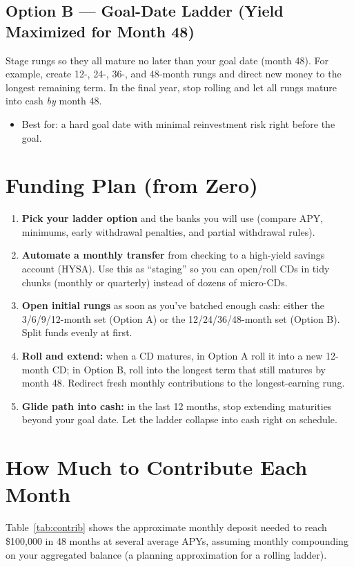 \documentclass[11pt]{article}
\begin{document}
\subsection*{Option B --- Goal-Date Ladder (Yield Maximized for Month 48)}
Stage rungs so they all mature no later than your goal date (month 48). For example, create 12-, 24-, 36-, and 48-month rungs and direct new money to the longest remaining term. In the final year, stop rolling and let all rungs mature into cash \emph{by} month 48.
\begin{itemize}
  \item Best for: a hard goal date with minimal reinvestment risk right before the goal.
\end{itemize}

\section*{Funding Plan (from Zero)}
\begin{enumerate}
  \item \textbf{Pick your ladder option} and the banks you will use (compare APY, minimums, early withdrawal penalties, and partial withdrawal rules).
  \item \textbf{Automate a monthly transfer} from checking to a high-yield savings account (HYSA). Use this as “staging” so you can open/roll CDs in tidy chunks (monthly or quarterly) instead of dozens of micro-CDs.
  \item \textbf{Open initial rungs} as soon as you’ve batched enough cash: either the 3/6/9/12-month set (Option A) or the 12/24/36/48-month set (Option B). Split funds evenly at first.
  \item \textbf{Roll and extend:} when a CD matures, in Option A roll it into a new 12-month CD; in Option B, roll into the longest term that still matures by month 48. Redirect fresh monthly contributions to the longest-earning rung.
  \item \textbf{Glide path into cash:} in the last 12 months, stop extending maturities beyond your goal date. Let the ladder collapse into cash right on schedule.
\end{enumerate}

\section*{How Much to Contribute Each Month}
Table~\ref{tab:contrib} shows the approximate monthly deposit needed to reach \$100{,}000 in 48 months at several average APYs, assuming monthly compounding on your aggregated balance (a planning approximation for a rolling ladder).
\end{document}
